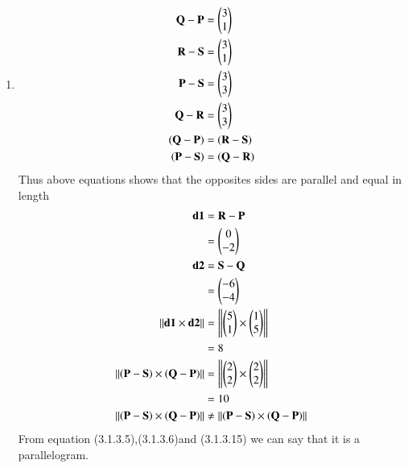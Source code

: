 \begin{enumerate}[label=\arabic*.,ref=\thesubsection.\theenumi]
\item
\begin{align}
\mathbf{Q} - \mathbf{P} &= \begin{pmatrix}3\\1\end{pmatrix}
\\
\mathbf{R} - \mathbf{S} &= \begin{pmatrix}3\\1\end{pmatrix}
\\
\mathbf{P} - \mathbf{S} &= \begin{pmatrix}3\\3\end{pmatrix}
\\
\mathbf {Q} - \mathbf {R} &= \begin{pmatrix}3\\3\end{pmatrix}
\\
\left(\mathbf{Q} - \mathbf{P}\right) &= \left(\mathbf{R} - \mathbf{S}\right)
\\
\left(\mathbf{P} - \mathbf{S}\right) &= \left(\mathbf{Q} - \mathbf{R}\right)
\end{align}
Thus above equations shows that the opposites sides are parallel and equal in length
\begin{align}
\mathbf{d1} &= \mathbf{R} - \mathbf{P} 
\\&= \begin{pmatrix}0\\-2\end{pmatrix}
\\
\mathbf{d2} &= \mathbf{S} - \mathbf{Q} 
\\&= \begin{pmatrix}-6\\-4\end{pmatrix}
\\\left\lVert \mathbf{\mathbf{d1}} \times \mathbf{\mathbf{d2}}\right\rVert &= 
\left\lVert \mathbf{\begin{pmatrix}5\\1\end{pmatrix}} \times \mathbf{\begin{pmatrix}1\\5\end{pmatrix}}\right\rVert 
\\&= 8
\\
\left\lVert \mathbf{\left(\mathbf {P} - \mathbf {S}\right)} \times \mathbf{\left(\mathbf {Q} - \mathbf {P}\right)}\right\rVert &= \left\lVert \mathbf{\begin{pmatrix}2\\2\end{pmatrix}} \times \mathbf{\begin{pmatrix}2\\2\end{pmatrix}}\right\rVert
\\ &= 10
\\
\left\lVert \mathbf{\left(\mathbf {P} - \mathbf {S}\right)} \times \mathbf{\left(\mathbf {Q} - \mathbf {P}\right)}\right\rVert &\neq \left\lVert \mathbf{\left(\mathbf {P} - \mathbf {S}\right)} \times \mathbf{\left(\mathbf {Q} - \mathbf {P}\right)}\right\rVert
\end{align}
From equation (3.1.3.5),(3.1.3.6)and (3.1.3.15) we can say that 
it is a parallelogram.
\end{enumerate}
